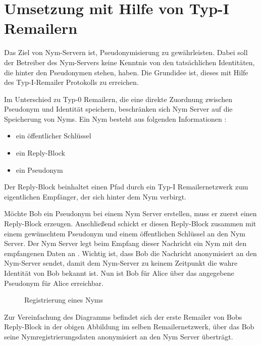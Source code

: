 \section{Umsetzung mit Hilfe von Typ-I Remailern}
Das Ziel von Nym-Servern ist, Pseudonymisierung zu gewährleisten. Dabei soll der Betreiber des Nym-Servers keine Kenntnis von den tatsächlichen Identitäten, die hinter den Pseudonymen stehen, haben. Die Grundidee ist, dieses mit Hilfe des Typ-I-Remailer Protokolls zu erreichen.

Im Unterschied zu Typ-0 Remailern, die eine direkte Zuordnung zwischen Pseudonym und Identität speichern, beschränken sich Nym Server auf die Speicherung von Nyms.
Ein Nym besteht aus folgenden Informationen \cite[S. 25]{loesing2009privacy}:
\begin{itemize}
\item ein öffentlicher Schlüssel
\item ein Reply-Block
\item ein Pseudonym
\end{itemize}

Der Reply-Block beinhaltet einen Pfad durch ein Typ-I Remailernetzwerk zum eigentlichen Empfänger, der sich hinter dem Nym verbirgt.

Möchte Bob ein Pseudonym bei einem Nym Server erstellen, muss er zuerst einen Reply-Block erzeugen. Anschließend schickt er diesen Reply-Block zusammen mit einem gewünschtem Pseudonym und einem öffentlichen Schlüssel an den Nym Server. Der Nym Server legt beim Empfang dieser Nachricht ein Nym mit den empfangenen Daten an \cite[S. 25]{loesing2009privacy}. Wichtig ist, dass Bob die Nachricht anonymisiert an den Nym-Server sendet, damit dem Nym-Server zu keinem Zeitpunkt die wahre Identität von Bob bekannt ist. Nun ist Bob für Alice über das angegebene Pseudonym für Alice erreichbar.

\begin{figure}
	\centering
	\begin{sequencediagram}
	\end{sequencediagram}
	\caption{Registrierung eines Nyms}
\end{figure}

Zur Vereinfachung des Diagramms befindet sich der erste Remailer von Bobs Reply-Block in der obigen Abbildung im selben Remailernetzwerk, über das Bob seine Nymregistrierungsdaten anonymisiert an den Nym Server überträgt.

